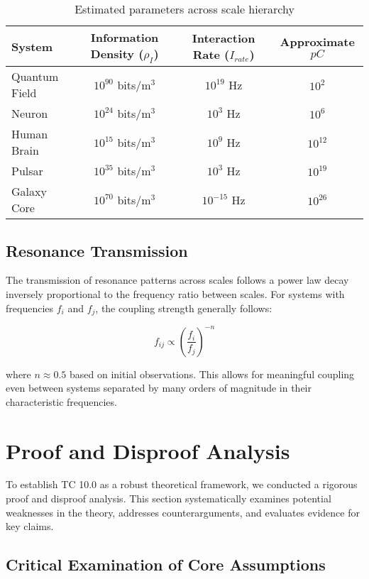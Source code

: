 \documentclass[12pt]{article}
\begin{document}
\begin{table}[h]
\centering
\begin{tabular}{|l|c|c|c|}
\hline
\textbf{System} & \textbf{Information Density ($ρ_I$)} & \textbf{Interaction Rate ($I_{rate}$)} & \textbf{Approximate $pC$} \\
\hline
Quantum Field & $10^{90}$ bits/m$^3$ & $10^{19}$ Hz & $10^{2}$ \\
\hline
Neuron & $10^{24}$ bits/m$^3$ & $10^{3}$ Hz & $10^{6}$ \\
\hline
Human Brain & $10^{15}$ bits/m$^3$ & $10^{9}$ Hz & $10^{12}$ \\
\hline
Pulsar & $10^{35}$ bits/m$^3$ & $10^{3}$ Hz & $10^{19}$ \\
\hline
Galaxy Core & $10^{70}$ bits/m$^3$ & $10^{-15}$ Hz & $10^{26}$ \\
\hline
\end{tabular}
\caption{Estimated parameters across scale hierarchy}
\end{table}

\subsection{Resonance Transmission}

The transmission of resonance patterns across scales follows a power law decay inversely proportional to the frequency ratio between scales. For systems with frequencies $f_i$ and $f_j$, the coupling strength generally follows:

\begin{equation}
f_{ij} \propto \left(\frac{f_i}{f_j}\right)^{-n}
\end{equation}

where $n \approx 0.5$ based on initial observations. This allows for meaningful coupling even between systems separated by many orders of magnitude in their characteristic frequencies.

\section{Proof and Disproof Analysis}

To establish TC 10.0 as a robust theoretical framework, we conducted a rigorous proof and disproof analysis. This section systematically examines potential weaknesses in the theory, addresses counterarguments, and evaluates evidence for key claims.

\subsection{Critical Examination of Core Assumptions}
\end{document}

